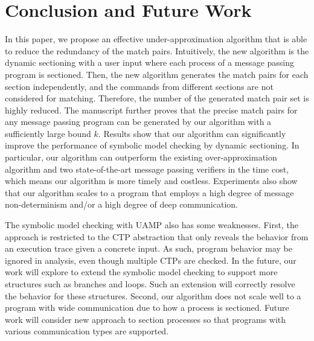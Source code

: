 \section{Conclusion and Future Work}
In this paper, we propose an effective under-approximation algorithm that is able to reduce the redundancy of the match pairs. Intuitively, the new algorithm is the dynamic sectioning with a user input where each process of a message passing program is sectioned. Then, the new algorithm generates the match pairs for each section independently, and the commands from different sections are not considered for matching. Therefore, the number of the generated match pair set is highly reduced. The manuscript further proves that the precise match pairs for any message passing program can be generated by our algorithm with a sufficiently large bound $k$. Results show that our algorithm can significantly improve the performance of symbolic model checking by dynamic sectioning. In particular, our algorithm can outperform the existing over-approximation algorithm and two state-of-the-art message passing verifiers in the time cost, which means our algorithm is more timely and costless. Experiments also show that our algorithm scales to a program that employs a high degree of message non-determinism and/or a high degree of deep communication.

The symbolic model checking with UAMP also has some weaknesses. 
First, the approach is restricted to the CTP abstraction that only reveals the behavior from an execution trace given a concrete input. 
As such, program behavior may be ignored in analysis, even though multiple CTPs are checked.
In the future, our work will explore to extend the symbolic model checking to support more structures such as branches and loops. 
Such an extension will correctly resolve the behavior for these structures. 
Second, our algorithm does not scale well to a program with wide communication due to how a process is sectioned. 
Future work will consider new approach to section processes so that programs with various communication types are supported.

